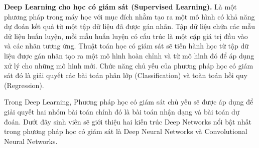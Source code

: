 	 \textbf{Deep Learning cho học có giám sát (Supervised Learning).} Là một phương pháp trong máy học với mục đích nhằm tạo ra một mô hình có khả năng dự đoán kết quả từ một tập dữ liệu đã được gán nhãn. Tập dữ liệu chứa các mẫu dữ liệu huấn luyện, mỗi mẫu huấn luyện có cấu trúc là một cặp giá trị đầu vào và các nhãn tương ứng. Thuật toán học có giám sát sẽ tiến hành học từ tập dữ liệu được gán nhãn tạo ra một mô hình hoàn chỉnh và từ mô hình đó để áp dụng xử lý cho những mô hình mới. Chức năng chủ yếu của phương pháp học có giám sát đó là giải quyết các bài toán phân lớp (Classification) và toàn toán hồi quy (Regression). \par
	 Trong Deep Learning, Phương pháp học có giám sát chủ yếu sẽ được áp dụng để giải quyết hai nhóm bài toán chính đó là bài toán nhận dạng và bài toán dự đoán. Dưới đây sinh viên sẽ giới thiệu hai kiến trúc Deep Networks nổi bật nhất trong phương pháp học có giám sát là Deep Neural Networks và Convolutional Neural Networks.
